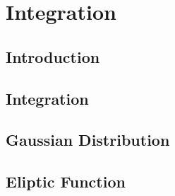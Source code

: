 \chapter{Integration}

\section{Introduction}

\section{Integration}

\section{Gaussian Distribution}

\section{Eliptic Function}


